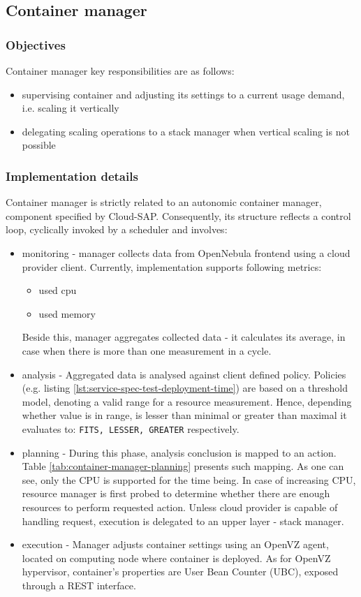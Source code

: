 \subsection{Container manager}

\subsubsection{Objectives}
Container manager key responsibilities are as follows:
\begin{itemize}
 \item supervising container and adjusting its settings to a current usage demand, i.e. scaling it vertically
 \item delegating scaling operations to a stack manager when vertical scaling is not possible
\end{itemize}

\subsubsection{Implementation details}
Container manager is strictly related to an autonomic container manager, component specified by Cloud-SAP. Consequently, its structure reflects a control loop, cyclically invoked by a scheduler and involves:
\begin{itemize}
 \item monitoring - manager collects data from OpenNebula frontend using a cloud provider client. Currently, implementation supports following metrics:
    \begin{itemize}
     \item used cpu
     \item used memory
    \end{itemize}
    Beside this, manager aggregates collected data - it calculates its average, in case when there is more than one measurement in a cycle.
    
 \item analysis - Aggregated data is analysed against client defined policy. Policies (e.g. listing \ref{lst:service-spec-test-deployment-time}) are based on a threshold model, denoting a valid range for a resource measurement. Hence, depending whether value is in range, is lesser than minimal or greater than maximal it evaluates to: \texttt{FITS, LESSER, GREATER} respectively.
 
 \item planning - During this phase, analysis conclusion is mapped to an action. Table \ref{tab:container-manager-planning} presents such mapping. As one can see, only the CPU is supported for the time being. In case of increasing CPU, resource manager is first probed to determine whether there are enough resources to perform requested action. Unless cloud provider is capable of handling request, execution is delegated to an upper layer - stack manager.
 
 \item execution - Manager adjusts container settings using an OpenVZ agent, located on computing node where container is deployed. As for OpenVZ hypervisor, container's properties are User Bean Counter (UBC), exposed through a REST interface.
\end{itemize}

